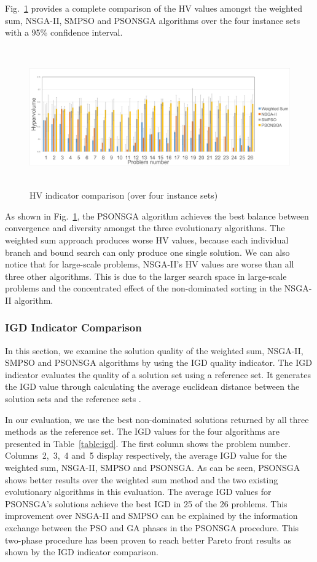 \documentclass[10pt,journal,compsoc]{IEEEtran}
\newcommand{\Fig}[1]{Fig.~\ref{#1}}
\begin{document}
\Fig{hvaverage} provides a complete comparison of the HV values amongst the weighted sum, NSGA-II, SMPSO and PSONSGA algorithms over the four instance sets with a 95\% confidence interval.
\begin{figure}[ht]
\centerline{\includegraphics[page=1,width=\textwidth, height= 6cm]{hvaverageoverfour.png}}
\caption{HV indicator comparison (over four instance sets)} 
\label{hvaverage}
\end{figure}

As shown in \Fig{hvaverage}, the PSONSGA algorithm achieves the best balance between convergence and diversity amongst the three evolutionary algorithms. The weighted sum approach produces worse HV values, because each individual branch and bound search can only produce one single solution. We can also notice that for large-scale problems, NSGA-II's HV values are worse than all three other algorithms. This is due to the larger search space in large-scale problems and the concentrated effect of the non-dominated sorting in the NSGA-II algorithm.


\subsubsection{IGD Indicator Comparison}
In this section, we examine the solution quality of the weighted sum, NSGA-II, SMPSO and PSONSGA algorithms by using the IGD quality indicator. The IGD indicator evaluates the quality of a solution set using a reference set. It generates the IGD value through calculating the average euclidean distance between the solution sets and the reference sets \cite{gaspar2015evolutionary}. %

In our evaluation, we use the best non-dominated solutions returned by all three methods as the reference set. The IGD values for the four algorithms are presented in Table~\ref{table:igd}. The first column shows the problem number. Columns~2,~3,~4 and~5 display respectively, the average IGD value for the weighted sum, NSGA-II, SMPSO and PSONSGA. As can be seen, PSONSGA shows better results over the weighted sum method and the two existing evolutionary algorithms in this evaluation. The average IGD values for PSONSGA's solutions achieve the best IGD in 25 of the 26 problems. This improvement over NSGA-II and SMPSO can be explained by the information exchange between the PSO and GA phases in the PSONSGA procedure. This two-phase procedure has been proven to reach better Pareto front results as shown by the IGD indicator comparison.
\end{document}
